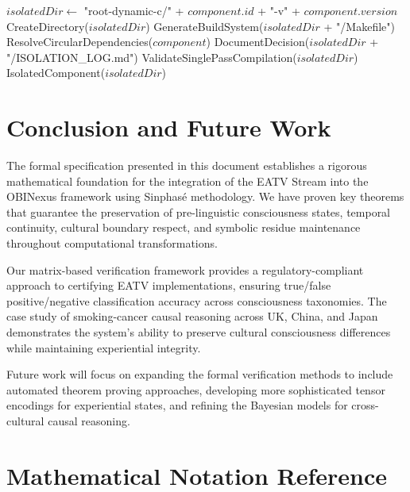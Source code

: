 \documentclass[11pt]{article}
\theoremstyle{definition}
\begin{document}
\begin{algorithm}
\caption{OBINexus Isolation Protocol}
\begin{algorithmic}[1]
    \State $isolatedDir \gets$ "root-dynamic-c/" + $component.id$ + "-v" + $component.version$
    \State CreateDirectory($isolatedDir$)
    \State GenerateBuildSystem($isolatedDir$ + "/Makefile")
    \State ResolveCircularDependencies($component$)
    \State DocumentDecision($isolatedDir$ + "/ISOLATION\_LOG.md")
    \State ValidateSinglePassCompilation($isolatedDir$)
    \State \Return IsolatedComponent($isolatedDir$)
\EndFunction
\end{algorithmic}
\end{algorithm}

\section{Conclusion and Future Work}

The formal specification presented in this document establishes a rigorous mathematical foundation for the integration of the EATV Stream into the OBINexus framework using Sinphasé methodology. We have proven key theorems that guarantee the preservation of pre-linguistic consciousness states, temporal continuity, cultural boundary respect, and symbolic residue maintenance throughout computational transformations.

Our matrix-based verification framework provides a regulatory-compliant approach to certifying EATV implementations, ensuring true/false positive/negative classification accuracy across consciousness taxonomies. The case study of smoking-cancer causal reasoning across UK, China, and Japan demonstrates the system's ability to preserve cultural consciousness differences while maintaining experiential integrity.

Future work will focus on expanding the formal verification methods to include automated theorem proving approaches, developing more sophisticated tensor encodings for experiential states, and refining the Bayesian models for cross-cultural causal reasoning.

\appendix

\section{Mathematical Notation Reference}
\end{document}
